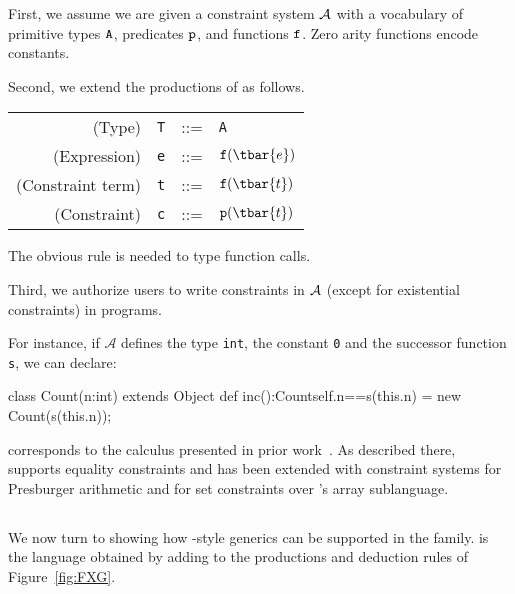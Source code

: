 First, we assume we are given a constraint system $\cal A$ with a vocabulary of primitive types ${\tt A}$,
predicates ${\tt p}$, and functions ${\tt f}$.  Zero arity
functions encode constants.

Second, we extend the productions of \FXZ{} as follows.
\begin{center}
\begin{tabular}{r@{\quad}rcl}
  (Type)& {\tt T} &{::=}& {\tt A} \\
  (Expression) & {\tt e} &{::=}& ${\tt f}(\tbar{e})$ \\
  (Constraint term) & {\tt t} &{::=}& ${\tt f}(\tbar{t})$ \\
  (Constraint) & {\tt c} &{::=}& ${\tt p}(\tbar{t})$ \\  
\end{tabular}
\end{center}

The obvious rule is needed to type function calls.

	{\Gamma{}}

Third, we authorize users to write constraints in $\cal A$ (except for existential constraints) in programs.

For instance, if $\mathcal{A}$ defines the type {\tt int}, the constant {\tt 0} and the successor function {\tt s}, we can declare:

\begin{xten}
class Count(n:int) extends Object {
  def inc():Count{self.n==s(this.n)} =
  	new Count(s(this.n));
}
\end{xten}

\FXD corresponds to the \CFJ calculus presented
in prior work~\cite{constrained-types}.  As described there, \Xten
supports equality constraints and has been extended with constraint
systems for Presburger arithmetic and for set constraints over
\Xten's array sublanguage.

\subsection{\FXG}
We now turn to showing how \FGJ{}-style generics can be supported in the \FX{} family.
\FXG{} is the language obtained by adding to \FXZ{} the productions and deduction rules of Figure~\ref{fig:FXG}.

